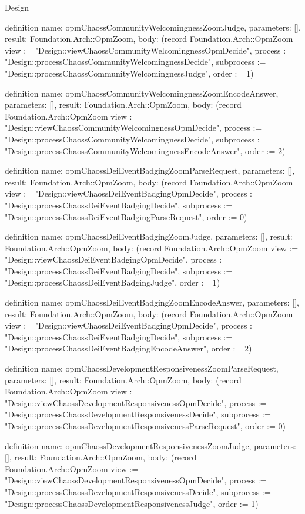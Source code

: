 \begin{lexlean}{Design}
\begin{semanticmodule}
definition{
  name: opmChaossCommunityWelcomingnessZoomJudge,
  parameters: [],
  result: Foundation.Arch::OpmZoom,
  body: (record Foundation.Arch::OpmZoom {view := "Design::viewChaossCommunityWelcomingnessOpmDecide", process := "Design::processChaossCommunityWelcomingnessDecide", subprocess := "Design::processChaossCommunityWelcomingnessJudge", order := 1})
}

definition{
  name: opmChaossCommunityWelcomingnessZoomEncodeAnswer,
  parameters: [],
  result: Foundation.Arch::OpmZoom,
  body: (record Foundation.Arch::OpmZoom {view := "Design::viewChaossCommunityWelcomingnessOpmDecide", process := "Design::processChaossCommunityWelcomingnessDecide", subprocess := "Design::processChaossCommunityWelcomingnessEncodeAnswer", order := 2})
}

definition{
  name: opmChaossDeiEventBadgingZoomParseRequest,
  parameters: [],
  result: Foundation.Arch::OpmZoom,
  body: (record Foundation.Arch::OpmZoom {view := "Design::viewChaossDeiEventBadgingOpmDecide", process := "Design::processChaossDeiEventBadgingDecide", subprocess := "Design::processChaossDeiEventBadgingParseRequest", order := 0})
}

definition{
  name: opmChaossDeiEventBadgingZoomJudge,
  parameters: [],
  result: Foundation.Arch::OpmZoom,
  body: (record Foundation.Arch::OpmZoom {view := "Design::viewChaossDeiEventBadgingOpmDecide", process := "Design::processChaossDeiEventBadgingDecide", subprocess := "Design::processChaossDeiEventBadgingJudge", order := 1})
}

definition{
  name: opmChaossDeiEventBadgingZoomEncodeAnswer,
  parameters: [],
  result: Foundation.Arch::OpmZoom,
  body: (record Foundation.Arch::OpmZoom {view := "Design::viewChaossDeiEventBadgingOpmDecide", process := "Design::processChaossDeiEventBadgingDecide", subprocess := "Design::processChaossDeiEventBadgingEncodeAnswer", order := 2})
}

definition{
  name: opmChaossDevelopmentResponsivenessZoomParseRequest,
  parameters: [],
  result: Foundation.Arch::OpmZoom,
  body: (record Foundation.Arch::OpmZoom {view := "Design::viewChaossDevelopmentResponsivenessOpmDecide", process := "Design::processChaossDevelopmentResponsivenessDecide", subprocess := "Design::processChaossDevelopmentResponsivenessParseRequest", order := 0})
}

definition{
  name: opmChaossDevelopmentResponsivenessZoomJudge,
  parameters: [],
  result: Foundation.Arch::OpmZoom,
  body: (record Foundation.Arch::OpmZoom {view := "Design::viewChaossDevelopmentResponsivenessOpmDecide", process := "Design::processChaossDevelopmentResponsivenessDecide", subprocess := "Design::processChaossDevelopmentResponsivenessJudge", order := 1})
}


\end{semanticmodule}
\end{lexlean}
